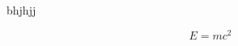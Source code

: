\documentclass[fontsize=11pt,jafontscale=0.925]{jlreq}
\begin{document}
bhjhjj

\begin{equation}
E = mc^2
\end{equation}
\end{document}
